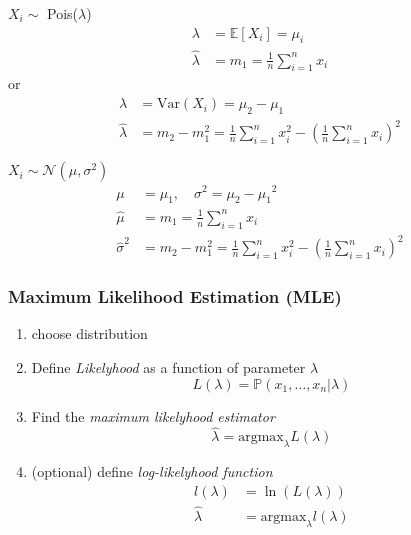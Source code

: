 \begin{examplesection}
    $X_i \sim$ Pois($\lambda$)
    \noindent\begin{align*}
        \lambda       & = \mathbb{E}[X_i] = \mu_i            \\
        \hat{\lambda} & = m_1 =\frac{1}{n}\sum_{i=1}^n {x_i}
    \end{align*}
    or
    \noindent\begin{align*}
        \lambda       & = \mathrm{Var}(X_i)=\mu_2-\mu_1                                                       \\
        \hat{\lambda} & =m_2-m_1^2=\frac{1}{n}\sum_{i=1}^n x_i^2-{\left(\frac{1}{n}\sum_{i=1}^n x_i\right)}^2
    \end{align*}

    $X_i \sim \mathcal{N}(\mu,\sigma^2)$
    \noindent\begin{align*}
        \mu            & = \mu_1, \quad \sigma^2 = \mu_2-{\mu_1}^2                                             \\
        \hat{\mu}      & =m_1=\frac{1}{n}\sum_{i=1}^n x_i                                                      \\
        \hat{\sigma}^2 & =m_2-m_1^2=\frac{1}{n}\sum_{i=1}^n x_i^2-{\left(\frac{1}{n}\sum_{i=1}^n x_i\right)}^2
    \end{align*}
\end{examplesection}

\subsubsection{Maximum Likelihood Estimation (MLE)}
\begin{enumerate}
    \item choose distribution
    \item Define \textit{Likelyhood} as a function of parameter $\lambda$
          \noindent\begin{equation*}
              L(\lambda) = \mathbb{P}(x_1,\ldots ,x_n|\lambda)
          \end{equation*}
    \item Find the \textit{maximum likelyhood estimator}
          \noindent\begin{equation*}
              \hat{\lambda} = \mathrm{argmax}_\lambda L(\lambda)
          \end{equation*}
    \item (optional) define \textit{log-likelyhood function}
          \noindent\begin{align*}
              l(\lambda)    & = \ln(L(\lambda))                    \\
              \hat{\lambda} & = \mathrm{argmax}_\lambda l(\lambda)
          \end{align*}
\end{enumerate}

